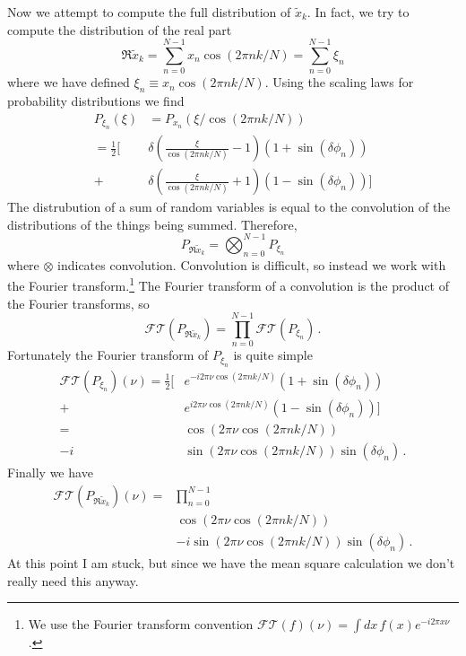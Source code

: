 \documentclass[twocolumn]{article}
\begin{document}
Now we attempt to compute the full distribution of $\tilde{x}_k$.
In fact, we try to compute the distribution of the real part
\begin{equation}
\Re \tilde{x}_k = \sum_{n=0}^{N-1} x_n \cos(2\pi n k / N) = \sum_{n=0}^{N-1} \xi_n
\end{equation}
where we have defined $\xi_n \equiv x_n \cos(2\pi n k / N)$.
Using the scaling laws for probability distributions we find
\begin{align}
P_{\xi_n}(\xi) &= P_{x_n}(\xi / \cos(2\pi n k / N)) \nonumber \\
= \frac{1}{2} \bigg[ & \delta \left( \frac{\xi}{\cos(2\pi n k / N)} - 1 \right) (1 + \sin(\delta \phi_n)) \nonumber \\
+ & \delta \left( \frac{\xi}{\cos(2 \pi n k / N)} + 1 \right) (1 - \sin(\delta \phi_n)) \bigg]
\end{align}
The distrubution of a sum of random variables is equal to the convolution of the distributions of the things being summed.
Therefore,
\begin{equation}
P_{\Re\tilde{x}_k} = \bigotimes_{n=0}^{N-1} P_{\xi_n}
\end{equation}
where $\otimes$ indicates convolution.
Convolution is difficult, so instead we work with the Fourier transform.\footnote{We use the Fourier transform convention $\mathcal{FT}(f)(\nu) = \int dx \, f(x) e^{-i 2 \pi x \nu}$.}
The Fourier transform of a convolution is the product of the Fourier transforms, so
\begin{equation}
\mathcal{FT}(P_{\Re \tilde{x}_k}) = \prod_{n=0}^{N-1} \mathcal{FT}(P_{\xi_n}) \, .
\end{equation}
Fortunately the Fourier transform of $P_{\xi_n}$ is quite simple
\begin{align}
\mathcal{FT}(P_{\xi_n})(\nu) = \frac{1}{2}
\bigg[
& e^{-i 2 \pi \nu \cos(2\pi n k / N)}(1 + \sin(\delta \phi_n)) \nonumber \\
+ & e^{ i 2 \pi \nu \cos(2\pi n k / N)}(1 - \sin(\delta \phi_n))
\bigg] \nonumber \\
= & \cos(2\pi \nu \cos(2\pi n k / N)) \nonumber \\
- i & \sin(2\pi \nu \cos(2 \pi n k / N))\sin(\delta \phi_n) \, .
\end{align}
Finally we have
\begin{align}
\mathcal{FT}(P_{\Re \tilde{x}_k})(\nu) = & \prod_{n=0}^{N-1} \nonumber \\
& \cos(2 \pi \nu \cos(2 \pi n k / N)) \nonumber \\
& - i \sin(2 \pi \nu \cos(2 \pi n k / N))\sin(\delta \phi_n) \, .
\end{align}
At this point I am stuck, but since we have the mean square calculation we don't really need this anyway.
\end{document}
